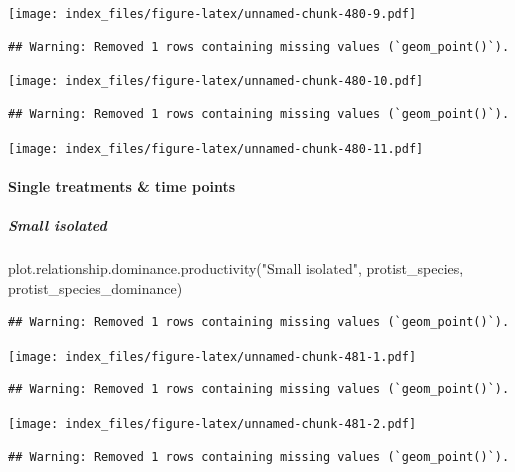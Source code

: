 \documentclass[
]{article}
\newenvironment{Shaded}{\begin{snugshade}}{\end{snugshade}}
\newcommand{\FunctionTok}[1]{\textcolor[rgb]{0.00,0.00,0.00}{#1}}
\newcommand{\NormalTok}[1]{#1}
\newcommand{\StringTok}[1]{\textcolor[rgb]{0.31,0.60,0.02}{#1}}
\begin{document}
\texttt{[image: index\_files/figure-latex/unnamed-chunk-480-9.pdf]}

\begin{verbatim}
## Warning: Removed 1 rows containing missing values (`geom_point()`).
\end{verbatim}

\texttt{[image: index\_files/figure-latex/unnamed-chunk-480-10.pdf]}

\begin{verbatim}
## Warning: Removed 1 rows containing missing values (`geom_point()`).
\end{verbatim}

\texttt{[image: index\_files/figure-latex/unnamed-chunk-480-11.pdf]}

\hypertarget{single-treatments-time-points-3}{%
\paragraph{Single treatments \& time
points}\label{single-treatments-time-points-3}}

\hypertarget{small-isolated-3}{%
\subparagraph{Small isolated}\label{small-isolated-3}}

\begin{Shaded}
\begin{Highlighting}[]
\FunctionTok{plot.relationship.dominance.productivity}\NormalTok{(}\StringTok{"Small isolated"}\NormalTok{,}
\NormalTok{                                         protist\_species,}
\NormalTok{                                         protist\_species\_dominance)}
\end{Highlighting}
\end{Shaded}

\begin{verbatim}
## Warning: Removed 1 rows containing missing values (`geom_point()`).
\end{verbatim}

\texttt{[image: index\_files/figure-latex/unnamed-chunk-481-1.pdf]}

\begin{verbatim}
## Warning: Removed 1 rows containing missing values (`geom_point()`).
\end{verbatim}

\texttt{[image: index\_files/figure-latex/unnamed-chunk-481-2.pdf]}

\begin{verbatim}
## Warning: Removed 1 rows containing missing values (`geom_point()`).
\end{verbatim}
\end{document}
